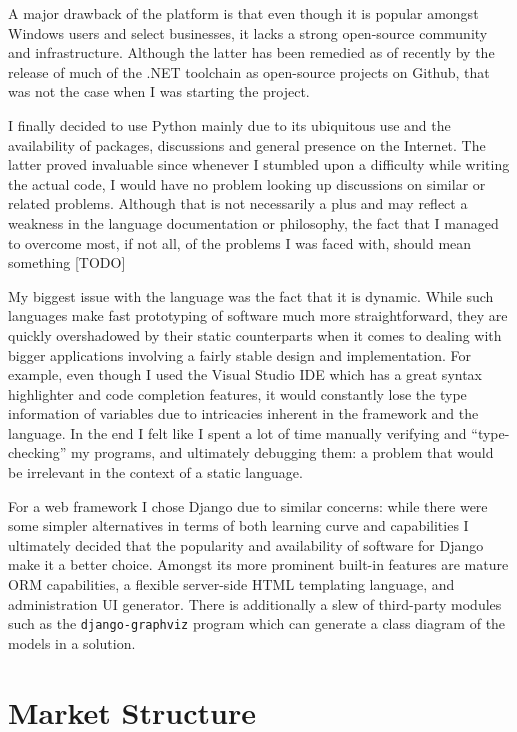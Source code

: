 \documentclass[bsc,frontabs,twoside,singlespacing,parskip,deptreport]{infthesis}     %
\begin{document}
\begin{itemize}
    A major drawback of the platform is that even though it is popular amongst Windows users and select businesses, it lacks a strong open-source community and infrastructure. Although the latter has been remedied as of recently by the release of much of the .NET toolchain as open-source projects on Github, that was not the case when I was starting the project.

\end{itemize}

    I finally decided to use Python mainly due to its ubiquitous use and the availability of packages, discussions and general presence on the Internet. The latter proved invaluable since whenever I stumbled upon a difficulty while writing the actual code, I would have no problem looking up discussions on similar or related problems. Although that is not necessarily a plus and may reflect a weakness in the language documentation or philosophy, the fact that I managed to overcome most, if not all, of the problems I was faced with, should mean something [TODO]

    My biggest issue with the language was the fact that it is dynamic. While such languages make fast prototyping of software much more straightforward, they are quickly overshadowed by their static counterparts when it comes to dealing with bigger applications involving a fairly stable design and implementation. For example, even though I used the Visual Studio IDE which has a great syntax highlighter and code completion features, it would constantly lose the type information of variables due to intricacies inherent in the framework and the language. In the end I felt like I spent a lot of time manually verifying and ``type-checking'' my programs, and ultimately debugging them: a problem that would be irrelevant in the context of a static language.
    
    For a web framework I chose Django due to similar concerns: while there were some simpler alternatives in terms of both learning curve and capabilities I ultimately decided that the popularity and availability of software for Django make it a better choice. Amongst its more prominent built-in features are mature ORM capabilities, a flexible server-side HTML templating language, and administration UI generator. There is additionally a slew of third-party modules such as the {\tt django-graphviz} program which can generate a class diagram of the models in a solution.


\section{Market Structure}
\end{document}
